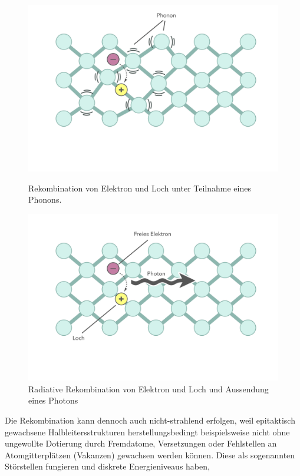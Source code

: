 \begin{figure}[htb]
    \centering
    \begin{minipage}[t]{0.49\linewidth}
        \centering
        \includegraphics[width=\linewidth]{Bilder/nonradRekomb.png}
        \caption{Rekombination von Elektron und Loch unter Teilnahme eines Phonons.}
    \end{minipage}%
    \hfill
    \begin{minipage}[t]{0.49\linewidth}
        \centering
        \includegraphics[width=\linewidth]{Bilder/radRekomb.png}
        \caption{Radiative Rekombination von Elektron und Loch und Aussendung eines Photons}
    \end{minipage}
		\label{fig:rekombphonon}
\end{figure}
\raggedright
Die Rekombination kann dennoch auch nicht-strahlend erfolgen, weil epitaktisch gewachsene Halbleitersstrukturen herstellungsbedingt beispielsweise nicht ohne ungewollte Dotierung durch Fremdatome, Versetzungen oder Fehlstellen an Atomgitterplätzen (Vakanzen) gewachsen werden können. Diese als sogenannten Störstellen fungieren und diskrete Energieniveaus haben, 
